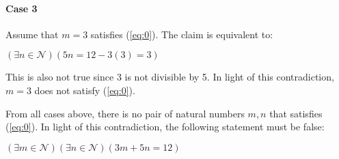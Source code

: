 \documentclass[14pt]{extarticle}
\begin{document}
	\paragraph{Case 3} Assume that $m=3$ satisfies (\ref{eq:0}).  The claim is equivalent to:
	\begin{center}
		$(\exists n \in \mathcal{N}) (5n = 12-3(3) = 3)$
	\end{center}
	This is also not true since 3 is not divisible by 5.  In light of this contradiction, $m=3$ does not satisfy (\ref{eq:0}).
	\par\bigskip
	From all cases above, there is no pair of natural numbers $m, n$ that satisfies (\ref{eq:0}).  In light of this contradiction, the following statement must be false:
	\begin{center}
	$(\exists m \in \mathcal{N})(\exists n \in \mathcal{N})(3m+5n=12)$
	\end{center}
\end{document}
